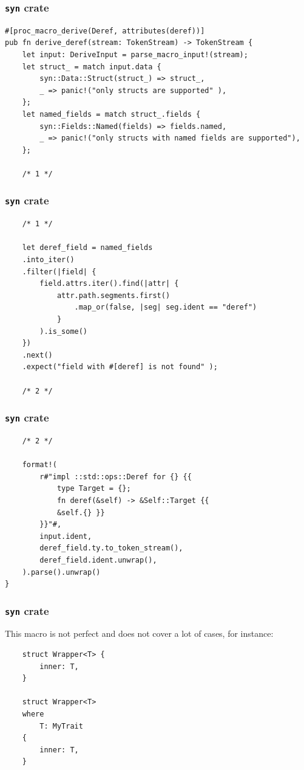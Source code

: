 \documentclass[aspectratio=1610,t]{beamer}
\begin{document}
\begin{frame}[fragile]
\frametitle{\texttt{syn} crate}
\begin{verbatim}
#[proc_macro_derive(Deref, attributes(deref))]
pub fn derive_deref(stream: TokenStream) -> TokenStream {
    let input: DeriveInput = parse_macro_input!(stream);
    let struct_ = match input.data {
        syn::Data::Struct(struct_) => struct_,
        _ => panic!("only structs are supported" ),
    };
    let named_fields = match struct_.fields {
        syn::Fields::Named(fields) => fields.named,
        _ => panic!("only structs with named fields are supported"),
    };

    /* 1 */
\end{verbatim}
\end{frame}


\begin{frame}[fragile]
\frametitle{\texttt{syn} crate}
\begin{verbatim}
    /* 1 */

    let deref_field = named_fields
    .into_iter()
    .filter(|field| {
        field.attrs.iter().find(|attr| {
            attr.path.segments.first()
                .map_or(false, |seg| seg.ident == "deref")
            }
        ).is_some()
    })
    .next()
    .expect("field with #[deref] is not found" );

    /* 2 */
\end{verbatim}
\end{frame}


\begin{frame}[fragile]
\frametitle{\texttt{syn} crate}
\begin{verbatim}
    /* 2 */

    format!(
        r#"impl ::std::ops::Deref for {} {{
            type Target = {};
            fn deref(&self) -> &Self::Target {{
            &self.{} }}
        }}"#,
        input.ident,
        deref_field.ty.to_token_stream(),
        deref_field.ident.unwrap(),
    ).parse().unwrap()
}
\end{verbatim}
\end{frame}


\begin{frame}[fragile]
\frametitle{\texttt{syn} crate}
This macro is not perfect and does not cover a lot of cases, for instance:

\begin{verbatim}
    struct Wrapper<T> {
        inner: T,
    }

    struct Wrapper<T>
    where
        T: MyTrait
    {
        inner: T,
    }
\end{verbatim}
\end{frame}
\end{document}

